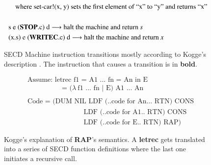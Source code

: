 \documentclass[a4paper,12pt,twoside,openright]{report}
\theoremstyle{definition}
\begin{document}
\begin{appendices}
\begin{figure}[htp!]
\begin{align*}
    & \quad\text{where set-car!(x, y) sets the first element of ``x'' to ``y'' and returns ``x''} \\ \\%
    & \text{s e (\textbf{STOP}.c) d} \longrightarrow \text{halt the machine and return \textit{s}} \\
    & \text{(x.s) e (\textbf{WRITEC}.c) d} \longrightarrow \text{halt the machine and return \textit{x}}
    \end{align*}
    \caption{SECD Machine instruction transitions mostly according to Kogge's description \cite{kogge1990architecture}. The instruction that causes a transition is in \textbf{bold}.}
    \label{fig:secd_kogge}
\end{figure}

\begin{figure}[htp!]
    \centering
    \begin{align*}
        & \text{Assume: letrec f1 = A1 ... fn = An in E} \\
        & \qquad\qquad\quad\text{= (} \lambda \: \text{f1 ... fn } | \text{ E) A1 ... An} \\ \\%
        & \text{Code = (DUM NIL LDF (..code for An... RTN) CONS} \\
        & \qquad\qquad\qquad\qquad\,\text{LDF (..code for A1.. RTN) CONS} \\
        & \qquad\qquad\qquad\qquad\,\text{LDF (..code for E.. RTN) RAP)}
    \end{align*}
    \caption{Kogge's \cite{kogge1990architecture} explanation of \textbf{RAP}'s semantics. A \textbf{letrec} gets translated into a series of SECD function definitions where the last one initiates a recursive call.}
    \label{fig:secd_kogge_rap}
\end{figure}
\end{appendices}
\end{document}
